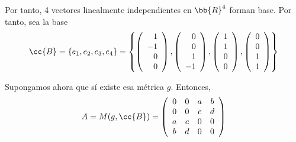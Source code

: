 \begin{ejercicio}
\begin{enumerate}
        Por tanto, 4 vectores linealmente independientes en $\bb{R}^4$ forman base. Por tanto, sea la base $$\cc{B} = \{e_1,e_2,e_3,e_4\} = \left\{
            \left(\begin{array}{r}
                 1 \\ -1 \\ 0 \\ 0
            \end{array} \right),
            \left(\begin{array}{r}
                  0 \\ 0 \\ 1 \\ -1
            \end{array} \right),
            \left(\begin{array}{r}
                 1 \\ 1 \\ 0 \\ 0
            \end{array} \right),
            \left(\begin{array}{r}
                  0 \\ 0 \\ 1 \\ 1
            \end{array} \right)
            \right\}$$

        Supongamos ahora que sí existe esa métrica $g$. Entonces,
        \begin{equation*}
            A = M(g, \cc{B}) = \left(\begin{array}{cccc}
                0 & 0 & a & b \\
                0 & 0 & c & d \\
                a & c & 0 & 0 \\
                b & d & 0 & 0
            \end{array} \right)
        \end{equation*}


\end{enumerate}
\end{ejercicio}

